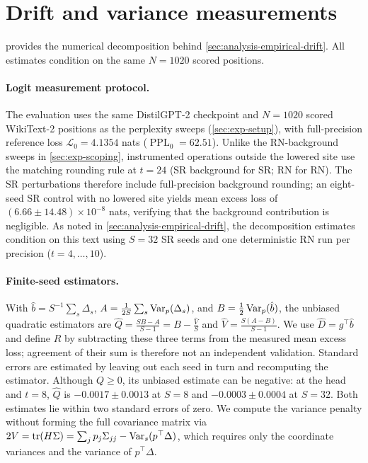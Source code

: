\FloatBarrier
\section{Drift and variance measurements}
\label{app:drift-measurements}

 provides the numerical decomposition behind
\cref{sec:analysis-empirical-drift}. All estimates condition on the same
$N=1020$ scored positions.

\paragraph{Logit measurement protocol.} The evaluation uses the same DistilGPT-2
checkpoint and $N=1020$ scored WikiText-2 positions as the perplexity sweeps
(\cref{sec:exp-setup}), with full-precision reference loss $\mathcal L_0=4.1354$ nats
($\operatorname{PPL}_0=62.51$).
Unlike the RN-background sweeps in \cref{sec:exp-scoping}, instrumented operations
outside the lowered site use the matching rounding rule at $t=24$ (SR background for SR;
RN for RN). The SR perturbations therefore include full-precision background rounding;
an eight-seed SR control with no lowered site yields mean excess loss of
$(6.66\pm14.48)\times10^{-8}$ nats, verifying that the background contribution is
negligible. As noted in \cref{sec:analysis-empirical-drift}, the decomposition estimates condition
on this text using $S=32$ SR seeds and one deterministic RN run per precision ($t=4,\ldots,10$).

\paragraph{Finite-seed estimators.}
With $\hat b=S^{-1}\sum_s\Delta_s$,
$A=\tfrac{1}{2S}\sum_s\operatorname{Var}_p(\Delta_s)$, and
$B=\tfrac12\operatorname{Var}_p(\hat b)$, the unbiased quadratic estimators are
$\hat Q = \tfrac{SB-A}{S-1} = B - \tfrac{\hat V}{S}$ and
$\hat V = \tfrac{S(A-B)}{S-1}$.
We use $\hat D=g^\top\hat b$ and define $\hat R$ by subtracting these three
terms from the measured mean excess loss; agreement of their sum is therefore
not an independent validation. Standard errors are estimated by leaving out each seed in turn and
recomputing the estimator. Although $Q\ge0$, its
unbiased estimate can be negative: at the head and $t=8$, $\hat Q$ is
$-0.0017\pm0.0013$ at $S=8$ and $-0.0003\pm0.0004$ at $S=32$. Both estimates lie within two standard errors of zero.
We compute the variance penalty without forming the full covariance matrix via
$2V=\operatorname{tr}(H\Sigma)=\sum_jp_j\Sigma_{jj}-\operatorname{Var}_s(p^\top\Delta)$,
which requires only the coordinate variances and the variance of $p^\top\Delta$.

